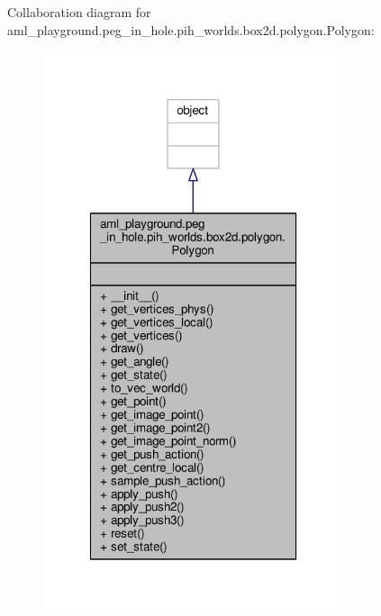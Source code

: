 Collaboration diagram for aml\-\_\-playground.\-peg\-\_\-in\-\_\-hole.\-pih\-\_\-worlds.\-box2d.\-polygon.\-Polygon\-:
\nopagebreak
\begin{figure}[H]
\begin{center}
\leavevmode
\includegraphics[width=250pt]{classaml__playground_1_1peg__in__hole_1_1pih__worlds_1_1box2d_1_1polygon_1_1_polygon__coll__graph}
\end{center}
\end{figure}
